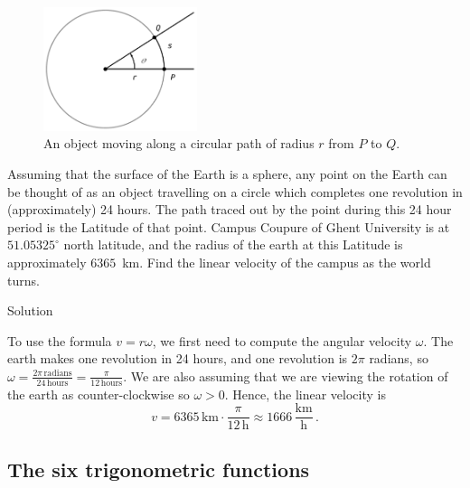 \begin{figure}[h]
	\begin{center}
			\includegraphics[width=0.4\textwidth]{fig_trans_10}
	\caption{An object  moving along a circular path of radius $r$ from $P$ to $Q$. }
	\label{fig_trans_10}
	\end{center}
\end{figure}


\begin{example}  \label{EarthRotationEx}

Assuming that the surface of the Earth is a sphere, any point on the Earth can be thought of as an object travelling on a circle which completes one revolution in (approximately) 24 hours. The path traced out by the point during this 24 hour period is the Latitude of that point.   Campus Coupure of Ghent University is at $51.05325^{\circ}$ north latitude, and the radius of the earth at this Latitude is approximately $6365$~km.  Find the linear velocity of the campus as the world turns.

Solution 

 To use the formula $v = r \omega$, we first need to compute the angular velocity $\omega$.  The earth makes one revolution in 24 hours, and one revolution is $2 \pi$ radians, so $\omega = \frac{2 \pi \, \text{radians}}{24 \, \text{hours}} = \frac{\pi}{12 \, \text{hours}}$. We are also assuming that we are viewing the rotation of the earth as counter-clockwise so $\omega > 0$.  Hence, the linear velocity is \[ v = 6365 \, \text{km} \cdot \frac{\pi}{12 \, \text{h}} \approx 1666 \, \frac{\text{km}}{\text{h}}\,.\]  
\end{example}

\fi

\subsection{The six trigonometric functions}
